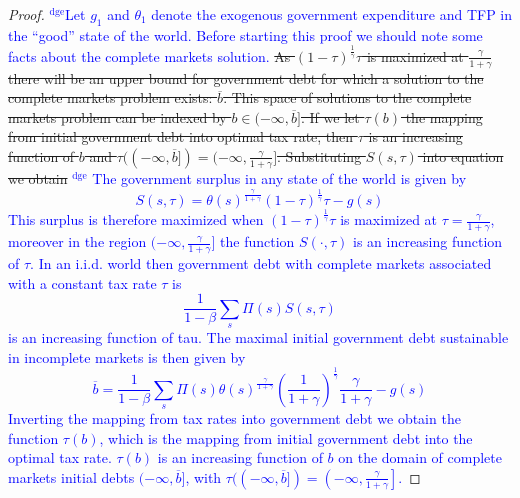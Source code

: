 \documentclass[12pt]{article}
\newcommand{\dge}[1]{\textcolor{blue}{$^{\textrm{dge}}${#1}}}
\begin{document}
\begin{proof}  \dge{Let $g_1$ and $\theta_1$ denote the exogenous government expenditure and TFP in the ``good'' state of the world.  Before starting this proof we should note some facts about the complete markets solution.}\st{
As $(1-\tau)^\frac1\gamma\tau$ is maximized at $\frac\gamma{1+\gamma}$ there will be an upper bound for government debt for which a solution to the complete markets problem exists: $\overline b$.  This space of solutions to the complete markets problem can be indexed by $b\in(-\infty,\overline b]$.  If we let $\tau(b)$ the mapping from initial government debt into optimal tax rate, then $\tau$ is an increasing function of $b$ and $\tau((-\infty,\overline b]) = (-\infty,\frac{\gamma}{1+\gamma}]$.    Substituting $S(s,\tau)$ into equation we obtain}
\dge{  The government surplus in any state of the world is given by 
\[
	S(s,\tau) = \theta(s)^\frac\gamma{1+\gamma}(1-\tau)^\frac1\gamma\tau - g(s)
\]  This surplus is therefore maximized when $(1-\tau)^\frac1\gamma\tau$ is maximized at $\tau = \frac\gamma{1+\gamma}$, moreover in the region $(-\infty,\frac\gamma{1+\gamma}]$ the function $S(\cdot,\tau)$ is an increasing function of $\tau$.  In an i.i.d. world then government debt with complete markets associated with a constant tax rate $\tau$ is 
\[
	\frac1{1-\beta} \sum_s \Pi(s) S(s,\tau)
\] is an increasing function of tau.  The maximal initial government debt sustainable in incomplete markets is then given by
\[
	\overline b = \frac1{1-\beta} \sum_s \Pi(s)\theta(s)^\frac\gamma{1+\gamma}\left(\frac{1}{1+\gamma}\right)^\frac1\gamma\frac{\gamma}{1+\gamma} - g(s)
\]Inverting the mapping from tax rates into government debt we obtain the function $\tau(b)$, which is the mapping from initial government debt into the optimal tax rate.  $\tau(b)$ is an increasing function of $b$ on the domain of complete markets initial debts $(-\infty,\overline b]$, with $\tau((-\infty,\overline{b}]) = \left(-\infty,\frac\gamma{1+\gamma}\right]$.}



\end{proof}
\end{document}

